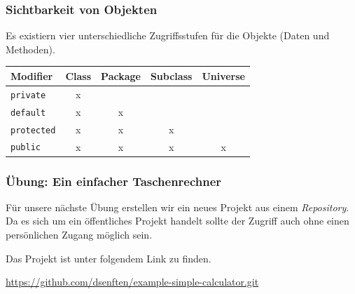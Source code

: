 \begin{frame}[fragile]
    \frametitle<presentation>{Sichtbarkeit von Objekten}

    Es existiern vier unterschiedliche Zugriffsstufen für die
    Objekte (Daten und Methoden).

    \begin{table}[ht]
        \begin{center}
            \begin{tabular}{p{3cm}|c|c|c|c}
                Modifier & Class & Package & Subclass & Universe \\ \hline
                \texttt{private}   & x & & &          \\
                \texttt{default}             & x & x & &          \\
                \texttt{protected} & x & x & x &          \\
                \texttt{public}    & x & x & x & x
            \end{tabular}
        \end{center}
        \label{tab:access-level}
    \end{table}

\end{frame}


\begin{frame}[fragile]
    \frametitle<presentation>{Übung: Ein einfacher Taschenrechner}
    Für unsere nächste Übung erstellen wir ein neues Projekt aus einem
    \emph{Repository}. Da es sich um ein öffentliches Projekt handelt sollte
    der Zugriff auch ohne einen persönlichen Zugang möglich sein.

    Das Projekt ist unter folgendem Link zu finden.

    \href{https://github.com/dsenften/example-simple-calculator.git}
    {https://github.com/dsenften/example-simple-calculator.git}
\end{frame}

